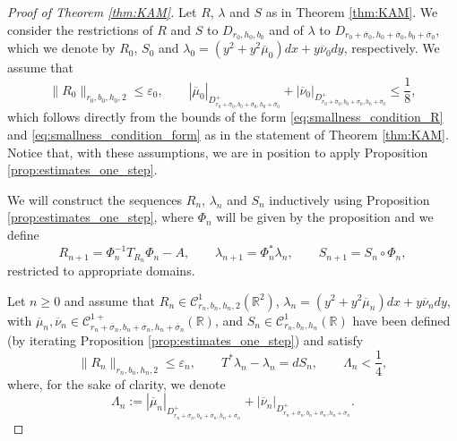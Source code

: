 \documentclass[10pt,a4paper]{amsart}
\newcommand{\C}{\mathbb{C}}
\newcommand{\Domain}[3]{D_{#1, #2, #3}}
\newcommand{\DomainP}[3]{D_{#1, #2, #3}^+}
\newcommand{\R}{\mathbb{R}}
\newcommand{\T}{\mathbb{T}}
\begin{document}
\begin{proof}[Proof of Theorem \ref{thm:KAM}]
Let $R$, $\lambda$ and $S$ as in Theorem \ref{thm:KAM}. %
We consider the restrictions of $R$ and $S$ to $\Domain{r_0}{h_0}{b_0}$ and of $\lambda$ to $\Domain{r_0 + \overline \sigma_0}{h_0 + \overline \sigma_0}{b_0 + \overline \sigma_0}$,  which we denote by $R_0$, $S_0$ and $\lambda_0 = (y^2 + y^2 \overline \mu_0) dx + y \overline \nu_0 dy$, respectively. We assume that
\[
\|R_0\|_{r_0,b_0,h_0,2}\leq \varepsilon_0, \qquad  |\overline \mu_0|_{\DomainP{r_0 + \overline \sigma_0}{b_0 + \overline \sigma_0}{h_0 + \overline \sigma_0}} + |\overline \nu_0|_{\DomainP{r_0 + \overline \sigma_0}{b_0 + \overline \sigma_0}{h_0 + \overline \sigma_0}} \leq \frac{1}{8},
\]
which follows directly from the bounds of the form \eqref{eq:smallness_condition_R} and \eqref{eq:smallness_condition_form} as in the statement of Theorem \ref{thm:KAM}. Notice that, with these assumptions, we are in position to apply Proposition \ref{prop:estimates_one_step}.

 We will construct the sequences $R_n$, $\lambda_n$ and $S_n$ inductively using Proposition \ref{prop:estimates_one_step}, where $\Phi_{n}$ will be given by the proposition and we define 
 \[R_{n + 1} = \Phi_n^{-1} T_{R_n} \Phi_n - A, \qquad \lambda_{n + 1} = \Phi_n^{*} \lambda_n, \qquad S_{n + 1} = S_n \circ \Phi_n,\]
 restricted to appropriate domains. 
 
 Let $n\geq 0$ and assume that $R_n \in \mathscr C^1_{r_n,b_n,h_n, 2}(\R^2)$, $\lambda_n = (y^2 + y^2 \overline \mu_n) dx + y \overline \nu_n dy$, with $\overline \mu_n, \overline \nu_n \in  \mathscr C^{1+}_{r_n + \overline \sigma_n,b_n + \overline \sigma_n,h_n + \overline \sigma_n}(\R)$, and $S_n \in \mathscr C^1_{r_n,b_n,h_n}(\R)$ have been defined (by iterating Proposition \ref{prop:estimates_one_step}) and satisfy
\begin{equation}
    \label{eq:inductiion_hyp}
\|R_n\|_{r_n,b_n,h_n,2}\leq \varepsilon_n,  \qquad T^* \lambda_n - \lambda_n = dS_n, \qquad \Lambda_n  < \frac{1}{4},
\end{equation}
where, for the sake of clarity, we denote
\begin{equation}
\label{eq:Lambda}
\Lambda_n:=  |\overline \mu_n|_{\DomainP{r_n + \overline \sigma_n}{b_n + \overline \sigma_n}{h_n + \overline \sigma_n}} + |\overline \nu_n|_{\DomainP{r_n + \overline \sigma_n}{b_n + \overline \sigma_n}{h_n + \overline \sigma_n}}. %
\end{equation}


\end{proof}
\end{document}
